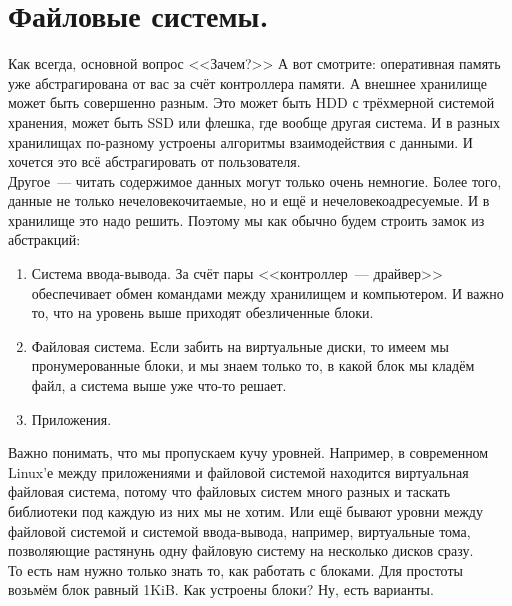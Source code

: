 \documentclass{article}
\begin{document}
    \section{Файловые системы.}
    Как всегда, основной вопрос <<Зачем?>> А вот смотрите: оперативная память уже абстрагирована от вас за счёт контроллера памяти. А внешнее хранилище может быть совершенно разным. Это может быть HDD с трёхмерной системой хранения, может быть SSD или флешка, где вообще другая система. И в разных хранилищах по-разному устроены алгоритмы взаимодействия с данными. И хочется это всё абстрагировать от пользователя.\\
    Другое~--- читать содержимое данных могут только очень немногие. Более того, данные не только нечеловекочитаемые, но и ещё и нечеловекоадресуемые. И в хранилище это надо решить. Поэтому мы как обычно будем строить замок из абстракций:
    \begin{enumerate}
        \item Система ввода-вывода. За счёт пары <<контроллер~--- драйвер>> обеспечивает обмен командами между хранилищем и компьютером. И важно то, что на уровень выше приходят обезличенные блоки.
        \item Файловая система. Если забить на виртуальные диски, то имеем мы пронумерованные блоки, и мы знаем только то, в какой блок мы кладём файл, а система выше уже что-то решает.
        \item Приложения.
    \end{enumerate}
    Важно понимать, что мы пропускаем кучу уровней. Например, в современном Linux'е между приложениями и файловой системой находится виртуальная файловая система, потому что файловых систем много разных и таскать библиотеки под каждую из них мы не хотим. Или ещё бывают уровни между файловой системой и системой ввода-вывода, например, виртуальные тома, позволяющие растянунь одну файловую систему на несколько дисков сразу.\\
    То есть нам нужно только знать то, как работать с блоками. Для простоты возьмём блок равный 1KiB. Как устроены блоки? Ну, есть варианты.
\end{document}
